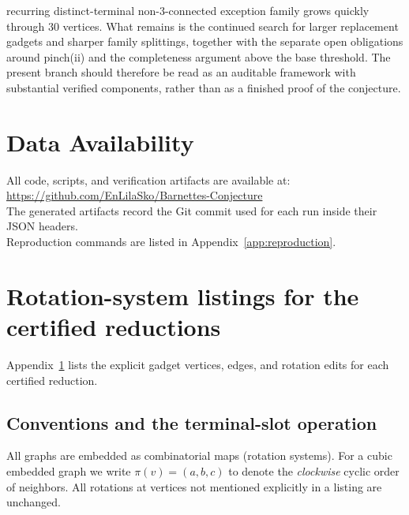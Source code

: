 \documentclass[12pt]{article}
\theoremstyle{definition}
\begin{document}
recurring distinct-terminal non-$3$-connected exception family grows quickly through $30$ vertices. What remains is the continued search for larger replacement gadgets and sharper family splittings, together with the separate open obligations around pinch(ii) and the completeness argument above the base threshold. The present branch should therefore be read as an auditable framework with substantial verified components, rather than as a finished proof of the conjecture.

\section*{Data Availability}
All code, scripts, and verification artifacts are available at:
\url{https://github.com/EnLilaSko/Barnettes-Conjecture} \\
The generated artifacts record the Git commit used for each run inside their JSON headers. \\
Reproduction commands are listed in Appendix~\ref{app:reproduction}.










\appendix
\section{Rotation-system listings for the certified reductions}
\label{app:rotation-listings}

Appendix~\ref{app:rotation-listings} lists the explicit gadget vertices, edges, and rotation edits for each certified reduction.


\subsection{Conventions and the terminal-slot operation}
\label{app:rot-conventions}

All graphs are embedded as combinatorial maps (rotation systems).  For a cubic embedded graph
we write $\pi(v) = (a,b,c)$ to denote the \emph{clockwise} cyclic order of neighbors. 
All rotations at vertices not mentioned explicitly in a listing are unchanged.
\end{document}
